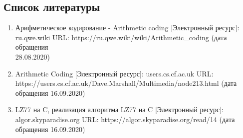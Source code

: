 \documentclass[12pt]{article}
\begin{document}
\subsection*{Список литературы}
\begin{enumerate}
	\item Арифметическое кодирование - Arithmetic coding [Электронный ресурс]:\\ ru.qwe.wiki URL: https://ru.qwe.wiki/wiki/Arithmetic\_coding (дата обращения\\ 28.08.2020)
	\item Arithmetic Coding [Электронный ресурс]: users.cs.cf.ac.uk URL:\\ https://users.cs.cf.ac.uk/Dave.Marshall/Multimedia/node213.html (дата обращения 16.09.2020)
	\item LZ77 на C, реализация алгоритма LZ77 на C [Электронный ресурс]:\\ algor.skyparadise.org URL: https://algor.skyparadise.org/read/14 (дата обращения 16.09.2020)
\end{enumerate}
\end{document}
